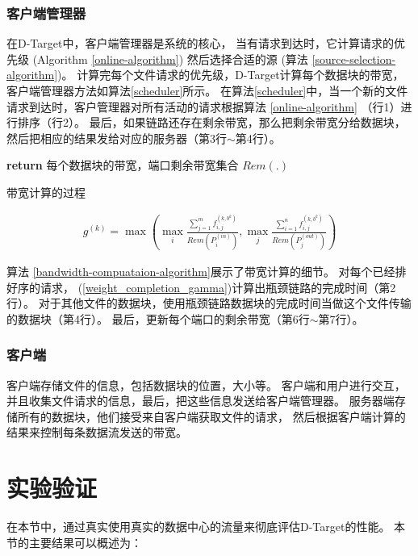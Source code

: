 \subsubsection{客户端管理器}
在D-Target中，客户端管理器是系统的核心，
当有请求到达时，它计算请求的优先级 (Algorithm \ref{online-algorithm}) 然后选择合适的源 (算法 \ref{source-selection-algorithm})。
计算完每个文件请求的优先级，D-Target计算每个数据块的带宽，客户端管理器方法如算法\ref{scheduler}所示。
在算法\ref{scheduler}中，当一个新的文件请求到达时，客户管理器对所有活动的请求根据算法 \ref{online-algorithm} （行1）进行排序（行2）。
最后，如果链路还存在剩余带宽，那么把剩余带宽分给数据块，然后把相应的结果发给对应的服务器（第3行$\sim$第4行）。

\begin{algorithm}
\textbf{return} 每个数据块的带宽，端口剩余带宽集合 $Rem(.)$ 
\caption{带宽计算的过程}
\label{bandwidth-compuataion-algorithm}
\end{algorithm}



\begin{eqnarray} \label{weight_completion_gamma}
g^{(k)}=\max(\max \limits_i \frac{ \sum_{j=1}^mf_{i,j}^{(k,b^k)}}{Rem(P_i^{(in)})},\max \limits_j \frac{ \sum_{i=1}^nf_{i,j}^{(k,b^k)}}{Rem(P_j^{(out)})})
\end{eqnarray}

算法 \ref{bandwidth-compuataion-algorithm}展示了带宽计算的细节。
对每个已经排好序的请求， (\ref{weight_completion_gamma})计算出瓶颈链路的完成时间（第2行）。
对于其他文件的数据块，使用瓶颈链路数据块的完成时间当做这个文件传输的数据块（第4行）。
最后，更新每个端口的剩余带宽（第6行$\sim$第7行）。

\subsubsection{客户端}
客户端存储文件的信息，包括数据块的位置，大小等。
客户端和用户进行交互，并且收集文件请求的信息，最后，把这些信息发送给客户端管理器。
服务器端存储所有的数据块，他们接受来自客户端获取文件的请求，
然后根据客户端计算的结果来控制每条数据流发送的带宽。


\section{实验验证}
\label{erasure_coding:evaluation}
在本节中，通过真实使用真实的数据中心的流量来彻底评估D-Target的性能。
本节的主要结果可以概述为：

